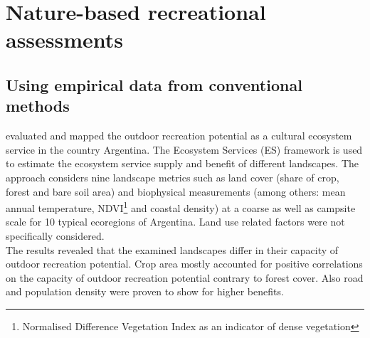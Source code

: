 \section{Nature-based recreational assessments}

\subsection{Using empirical data from conventional methods}

\textcite{Weyland2014} evaluated and mapped the outdoor recreation potential as a cultural ecosystem service in the country Argentina. The Ecosystem Services (ES) framework is used to estimate the ecosystem service supply and benefit of different landscapes. The approach considers nine landscape metrics such as land cover (share of crop, forest and bare soil area) and biophysical measurements (among others: mean annual temperature, NDVI\footnote{Normalised Difference Vegetation Index as an indicator of dense vegetation} and coastal density) at a coarse as well as campsite scale for 10 typical ecoregions of Argentina. Land use related factors were not specifically considered. \\
The results revealed that the examined landscapes differ in their capacity of outdoor recreation potential. Crop area mostly accounted for positive correlations on the capacity of outdoor recreation potential contrary to forest cover. Also road and population density were proven to show for higher benefits. \\

